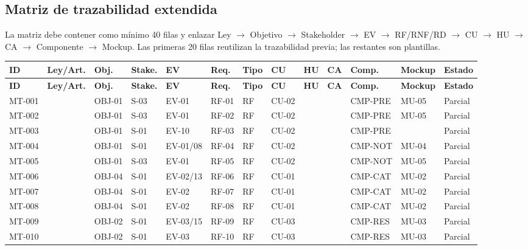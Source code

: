 \documentclass[12pt,journal,onecolumn]{IEEEtran}
\begin{document}
\subsection{Matriz de trazabilidad extendida}
La matriz debe contener como mínimo 40 filas y enlazar Ley $\rightarrow$ Objetivo $\rightarrow$ Stakeholder $\rightarrow$ EV $\rightarrow$ RF/RNF/RD $\rightarrow$ CU $\rightarrow$ HU $\rightarrow$ CA $\rightarrow$ Componente $\rightarrow$ Mockup. Las primeras 20 filas reutilizan la trazabilidad previa; las restantes son plantillas.

\begin{landscape}
\tiny
\begin{longtable}{P{0.9cm}P{1.0cm}P{0.8cm}P{1.0cm}P{1.1cm}P{1.0cm}P{1.0cm}P{0.7cm}P{0.9cm}P{0.9cm}P{0.9cm}P{1.2cm}P{1.1cm}}
\toprule
\textbf{ID} & \textbf{Ley/Art.} & \textbf{Obj.} & \textbf{Stake.} & \textbf{EV} & \textbf{Req.} & \textbf{Tipo} & \textbf{CU} & \textbf{HU} & \textbf{CA} & \textbf{Comp.} & \textbf{Mockup} & \textbf{Estado}\\\midrule\endfirsthead
\toprule
\textbf{ID} & \textbf{Ley/Art.} & \textbf{Obj.} & \textbf{Stake.} & \textbf{EV} & \textbf{Req.} & \textbf{Tipo} & \textbf{CU} & \textbf{HU} & \textbf{CA} & \textbf{Comp.} & \textbf{Mockup} & \textbf{Estado}\\\midrule\endhead
MT-001 &  & OBJ-01 & S-03 & EV-01 & RF-01 & RF & CU-02 &  &  & CMP-PRE & MU-05 & Parcial\\
MT-002 &  & OBJ-01 & S-03 & EV-01 & RF-02 & RF & CU-02 &  &  & CMP-PRE & MU-05 & Parcial\\
MT-003 &  & OBJ-01 & S-01 & EV-10 & RF-03 & RF & CU-02 &  &  & CMP-PRE &  & Parcial\\
MT-004 &  & OBJ-01 & S-01 & EV-01/08 & RF-04 & RF & CU-02 &  &  & CMP-NOT & MU-04 & Parcial\\
MT-005 &  & OBJ-01 & S-03 & EV-01 & RF-05 & RF & CU-02 &  &  & CMP-NOT & MU-05 & Parcial\\
MT-006 &  & OBJ-04 & S-01 & EV-02/13 & RF-06 & RF & CU-01 &  &  & CMP-CAT & MU-02 & Parcial\\
MT-007 &  & OBJ-04 & S-01 & EV-02 & RF-07 & RF & CU-01 &  &  & CMP-CAT & MU-02 & Parcial\\
MT-008 &  & OBJ-04 & S-01 & EV-02 & RF-08 & RF & CU-01 &  &  & CMP-CAT & MU-02 & Parcial\\
MT-009 &  & OBJ-02 & S-01 & EV-03/15 & RF-09 & RF & CU-03 &  &  & CMP-RES & MU-03 & Parcial\\
MT-010 &  & OBJ-02 & S-01 & EV-03 & RF-10 & RF & CU-03 &  &  & CMP-RES & MU-03 & Parcial\\

\end{longtable}
\end{landscape}
\end{document}
